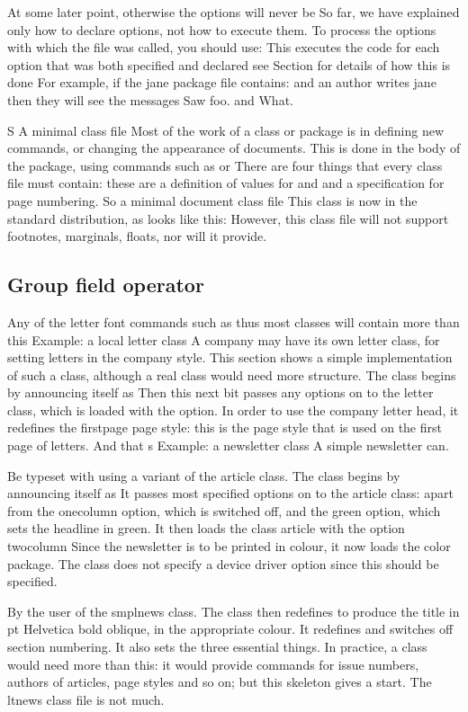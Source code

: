 \documentclass{article}
\begin{document}
At some later point, otherwise the options will never be So far, we have explained only how to declare options, not how to execute them. To process the options with which the file was called, you should use: This executes the code for each option that was both specified and declared see Section for details of how this is done For example, if the jane package file contains: and an author writes jane then they will see the messages Saw foo. and What.

S A minimal class file Most of the work of a class or package is in defining new commands, or changing the appearance of documents. This is done in the body of the package, using commands such as or There are four things that every class file must contain: these are a definition of values for and and a specification for page numbering. So a minimal document class file This class is now in the standard distribution, as looks like this: However, this class file will not support footnotes, marginals, floats, nor will it provide.

\subsection{Group field operator}
Any of the letter font commands such as thus most classes will contain more than this Example: a local letter class A company may have its own letter class, for setting letters in the company style. This section shows a simple implementation of such a class, although a real class would need more structure. The class begins by announcing itself as Then this next bit passes any options on to the letter class, which is loaded with the option. In order to use the company letter head, it redefines the firstpage page style: this is the page style that is used on the first page of letters. And that s Example: a newsletter class A simple newsletter can.

Be typeset with using a variant of the article class. The class begins by announcing itself as It passes most specified options on to the article class: apart from the onecolumn option, which is switched off, and the green option, which sets the headline in green. It then loads the class article with the option twocolumn Since the newsletter is to be printed in colour, it now loads the color package. The class does not specify a device driver option since this should be specified.

By the user of the smplnews class. The class then redefines to produce the title in pt Helvetica bold oblique, in the appropriate colour. It redefines and switches off section numbering. It also sets the three essential things. In practice, a class would need more than this: it would provide commands for issue numbers, authors of articles, page styles and so on; but this skeleton gives a start. The ltnews class file is not much.
\end{document}
